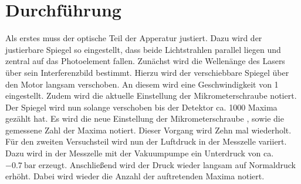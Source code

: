 
\section{Durchführung}
\label{sec:Durchführung}
Als erstes muss der optische Teil der Apperatur justiert. Dazu wird der justierbare
Spiegel so eingestellt, dass beide Lichtstrahlen parallel liegen und zentral auf das Photoelement fallen.
Zunächst wird die Wellenänge des Lasers über sein Interferenzbild bestimmt. Hierzu
wird der verschiebbare Spiegel über den Motor langsam verschoben. An diesem wird eine Geschwindigkeit von 1 eingestellt.
Zudem wird die aktuelle Einstellung der Mikrometerschraube notiert.
Der Spiegel wird nun solange verschoben bis der Detektor ca. 1000 Maxima gezählt hat. Es
wird die neue Einstellung der Mikrometerschraube , sowie die gemessene Zahl der Maxima notiert. Dieser Vorgang wird Zehn mal wiederholt.
Für den zweiten Versuchsteil wird nun der Luftdruck in der Messzelle variiert. Dazu
wird in der Messzelle mit der Vakuumpumpe ein Unterdruck von ca. $\SI{-0.7}{\bar}$ erzeugt.
Anschließend wird der Druck wieder langsam auf Normaldruck erhöht. Dabei wird wieder die Anzahl der auftretenden Maxima notiert.

